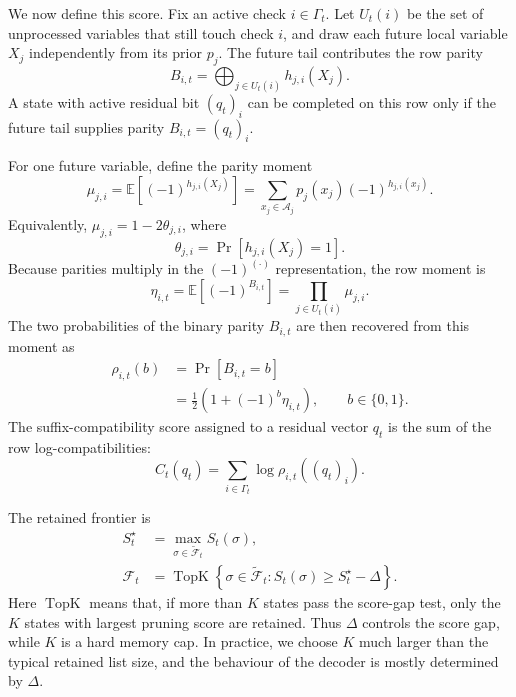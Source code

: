 \documentclass[a4paper,twocolumn,11pt,unpublished]{quantumarticle}
\newcommand{\A}{\mathcal{A}}
\begin{document}
We now define this score. Fix an active check \(i\in\Gamma_t\). Let \(U_t(i)\)
be the set of unprocessed variables that still touch check \(i\), and draw each
future local variable \(X_j\) independently from its prior \(p_j\). The future
tail contributes the row parity
\begin{equation}
    B_{i,t}
    =
    \bigoplus_{j\in U_t(i)} h_{j,i}(X_j).
\end{equation}
A state with active residual bit \((q_t)_i\) can be completed on this row only
if the future tail supplies parity \(B_{i,t}=(q_t)_i\).

For one future variable, define the parity moment
\begin{equation}
    \mu_{j,i}
    =
    \mathbb E\!\left[(-1)^{h_{j,i}(X_j)}\right]
    =
    \sum_{x_j\in\A_j}p_j(x_j)(-1)^{h_{j,i}(x_j)}.
\end{equation}
Equivalently, \(\mu_{j,i}=1-2\theta_{j,i}\), where
\begin{equation}
    \theta_{j,i}
    =
    \Pr\!\left[h_{j,i}(X_j)=1\right].
\end{equation}
Because parities multiply in the \((-1)^{(\cdot)}\) representation, the row
moment is
\begin{equation}
    \eta_{i,t}
    =
    \mathbb E\!\left[(-1)^{B_{i,t}}\right]
    =
    \prod_{j\in U_t(i)}\mu_{j,i}.
\end{equation}
The two probabilities of the binary parity \(B_{i,t}\) are then recovered from
this moment as
\begin{align}
    \rho_{i,t}(b)
    &=
    \Pr[B_{i,t}=b]\nonumber\\
    &=
    \frac{1}{2}\left(1+(-1)^b\eta_{i,t}\right),
    \qquad b\in\{0,1\}.
\end{align}
The suffix-compatibility score assigned to a residual vector \(q_t\) is the sum
of the row log-compatibilities:
\begin{equation}
    C_t(q_t)
    =
    \sum_{i\in\Gamma_t}\log \rho_{i,t}((q_t)_i).
    \label{eq:suffix_score}
\end{equation}

The retained frontier is
\begin{align}
    S_t^\star&=\max_{\sigma\in\widetilde{\mathcal F}_t}S_t(\sigma),\nonumber\\
    \mathcal F_t
    &=
    \operatorname{TopK}
    \left\{
      \sigma\in\widetilde{\mathcal F}_t:
      S_t(\sigma)\ge S_t^\star-\Delta
    \right\}.
    \label{eq:pruning}
\end{align}
Here \(\operatorname{TopK}\) means that, if more than \(K\) states pass the
score-gap test, only the \(K\) states with largest pruning score are retained.
Thus \(\Delta\) controls the score gap, while \(K\) is a hard memory cap. In
practice, we choose \(K\) much larger than the typical retained list size, and
the behaviour of the decoder is mostly determined by \(\Delta\).
\end{document}
